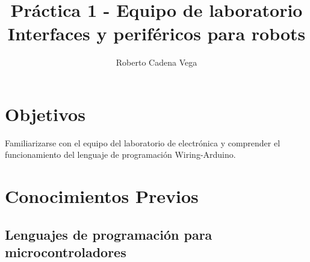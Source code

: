 



\title{Práctica 1 - Equipo de laboratorio\\Interfaces y periféricos para robots}
\author{Roberto Cadena Vega} %
\date{}



\maketitle %


\section{Objetivos}

	Familiarizarse con el equipo del laboratorio de electrónica y comprender el funcionamiento del lenguaje de programación Wiring-Arduino.


\section{Conocimientos Previos}


	\subsection{Lenguajes de programación para microcontroladores}

